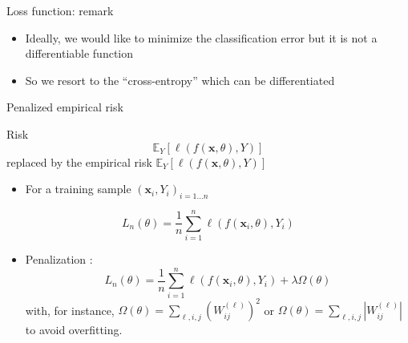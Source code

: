 \documentclass[ignorenonframetext,]{beamer}
\providecommand{\tightlist}{%
  \setlength{\itemsep}{0pt}\setlength{\parskip}{0pt}}
\begin{document}
\begin{frame}{Loss function: remark}
\protect\hypertarget{loss-function-remark}{}

\begin{itemize}
\tightlist
\item
  Ideally, we would like to minimize the classification error but it is
  not a differentiable function
\item
  So we resort to the ``cross-entropy'' which can be differentiated
\end{itemize}

\end{frame}

\begin{frame}{Penalized empirical risk}
\protect\hypertarget{penalized-empirical-risk}{}

Risk \[\mathbb{E}_{Y}[\ell(f(\mathbf{x},\theta),Y)]\] replaced by the
empirical risk \(\mathbb{E}_{Y}[\ell(f(\mathbf{x},\theta),Y)]\)

\begin{itemize}
\tightlist
\item
  For a training sample \((\mathbf{x}_i,Y_i)_{i=1\dots n}\)
\end{itemize}

\[ L_n(\theta) = \frac{1}{n}\sum_{i=1}^n  \ell(f(\mathbf{x}_i,\theta),Y_i)\]

\begin{itemize}
\tightlist
\item
  Penalization :
  \[ L_n(\theta) = \frac{1}{n}\sum_{i=1}^n  \ell(f(\mathbf{x}_i,\theta),Y_i) + \lambda \Omega(\theta) \]
  with, for instance,
  \(\Omega(\theta) = \sum_{\ell,i,j} (W^{(\ell)}_{ij})^2\) or
  \(\Omega(\theta) = \sum_{\ell,i,j} |W^{(\ell)}_{ij}|\) to avoid
  overfitting.
\end{itemize}

\end{frame}
\end{document}
